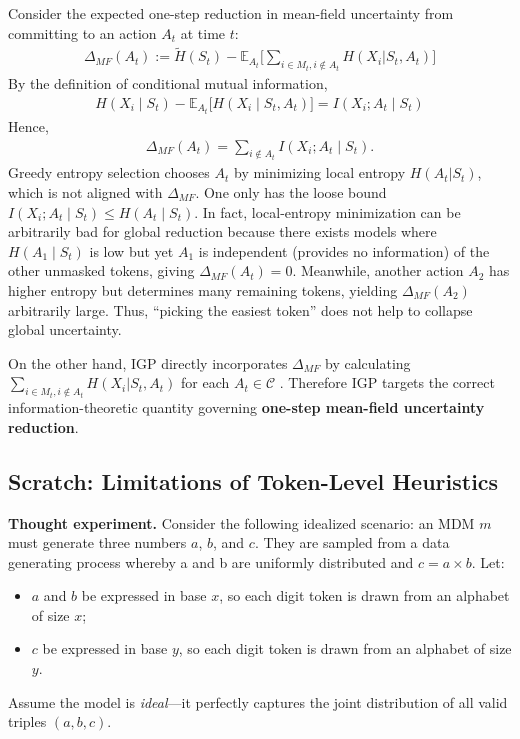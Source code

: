Consider the expected one-step reduction in mean-field uncertainty from committing to an action $A_t$ at time $t$:
\begin{align}
    \Delta_{MF}(A_t) := \tilde H(S_t) - \mathbb{E}_{A_t} \Big[ \sum_{i\in M_t, i \notin A_t} H(X_i | S_t, A_t)\Big]
\end{align}
By the definition of conditional mutual information,
\begin{align}
    H(X_i \mid S_t) - \mathbb{E}_{A_t}\Big[H(X_i \mid S_t, A_t)\Big] = I(X_i;A_t \mid S_t)
\end{align}
Hence,
\begin{align*}
    \Delta_{MF}(A_t) = \sum_{i \notin A_t}I(X_i; A_t\mid S_t).
\end{align*}
Greedy entropy selection chooses $A_t$ by minimizing local entropy $H(A_t|S_t)$, which is not aligned with $\Delta_{MF}$. One only has the loose bound $I(X_i; A_t \mid S_t) \leq H(A_t \mid S_t)$. In fact, local-entropy minimization can be arbitrarily bad for global reduction because there exists models where $H(A_1\mid S_t)$ is low but yet $A_1$ is independent (provides no information) of the other unmasked tokens, giving $\Delta_{MF}(A_t) = 0$. Meanwhile, another action $A_2$ has higher entropy but determines many remaining tokens, yielding $\Delta_{MF}(A_2)$ arbitrarily large. Thus, ``picking the easiest token'' does not help to collapse global uncertainty.

On the other hand, IGP directly incorporates $\Delta_{MF}$ by calculating $\sum_{i\in M_t, i \notin A_t} H(X_i | S_t, A_t)$ for each $A_t \in \mathcal{C}$ . Therefore IGP targets the correct information-theoretic quantity governing \textbf{one-step mean-field uncertainty reduction}.



\clearpage

\subsection{Scratch: Limitations of Token-Level Heuristics}

\noindent\textbf{Thought experiment.}  
Consider the following idealized scenario: an MDM $m$ must generate three numbers \(a\), \(b\), and \(c\). They are sampled from a data generating process whereby a and b are uniformly distributed and \(c = a \times b\).  
Let:
\begin{itemize}
    \item \(a\) and \(b\) be expressed in base \(x\), so each digit token is drawn from an alphabet of size \(x\);
    \item \(c\) be expressed in base \(y\), so each digit token is drawn from an alphabet of size \(y\).
\end{itemize}
Assume the model is \emph{ideal}—it perfectly captures the joint distribution of all valid triples \((a,b,c)\).

